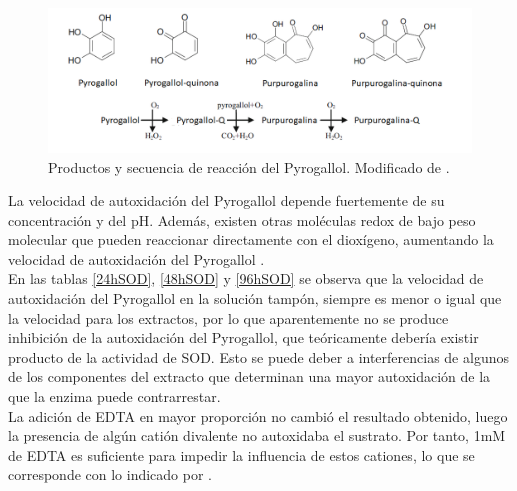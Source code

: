 \begin{figure}[hbtp]
	\centering
	\includegraphics[scale=0.6]{Imagenes/pyr}
	\caption{Productos y secuencia de reacci\'on del Pyrogallol. Modificado de \cite{ramasarma2015new}.}
	\label{pyr}
\end{figure}

La velocidad de autoxidaci\'on del Pyrogallol depende fuertemente de su concentraci\'on y del pH. Adem\'as, existen otras mol\'eculas redox de bajo peso molecular que pueden reaccionar directamente con el diox\'igeno, aumentando la velocidad de autoxidaci\'on del Pyrogallol \citep{gao1998mechanism}. \\




En las tablas \ref{24hSOD}, \ref{48hSOD} y \ref{96hSOD} se observa que la velocidad de autoxidaci\'on del Pyrogallol en la soluci\'on tamp\'on,  siempre es menor o igual que la velocidad para los extractos, por lo que aparentemente no se produce inhibici\'on de la autoxidaci\'on del Pyrogallol, que te\'oricamente deber\'ia existir producto de la actividad de SOD. Esto se puede deber a interferencias de algunos de los componentes del extracto que determinan una mayor autoxidación de la que la enzima puede contrarrestar. \\

La adición de EDTA en mayor proporción no cambi\'o el  resultado obtenido, luego la presencia de algún catión divalente no autoxidaba el sustrato. Por tanto, 1mM de EDTA es suficiente para impedir la influencia de estos cationes, lo que se corresponde con lo indicado por \cite{marklund1974involvement}. \\

